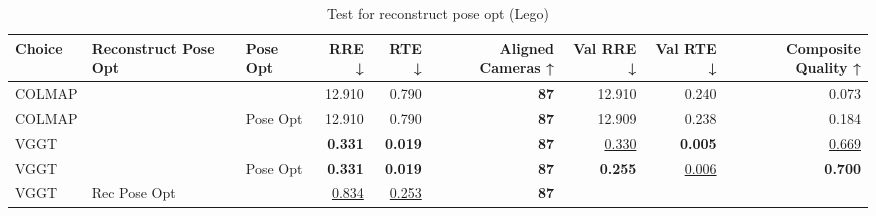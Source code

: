 \begin{table}[H]
\caption{Test for reconstruct pose opt (Lego)}
\label{tab:99_reconstruct_pose_opt_lego}
\begin{tabular}{lllrrrrrr}
\toprule
Choice & Reconstruct Pose Opt & Pose Opt & RRE ↓ & RTE ↓ & Aligned Cameras ↑ & Val RRE ↓ & Val RTE ↓ & Composite Quality ↑ \\
\midrule
COLMAP &  &  & 12.910 & 0.790 & \textbf{87} & 12.910 & 0.240 & 0.073 \\
COLMAP &  & Pose Opt & 12.910 & 0.790 & \textbf{87} & 12.909 & 0.238 & 0.184 \\
VGGT &  &  & \textbf{0.331} & \textbf{0.019} & \textbf{87} & \underline{0.330} & \textbf{0.005} & \underline{0.669} \\
VGGT &  & Pose Opt & \textbf{0.331} & \textbf{0.019} & \textbf{87} & \textbf{0.255} & \underline{0.006} & \textbf{0.700} \\
VGGT & Rec Pose Opt &  & \underline{0.834} & \underline{0.253} & \textbf{87} &  &  &  \\
\bottomrule
\end{tabular}
\end{table}
